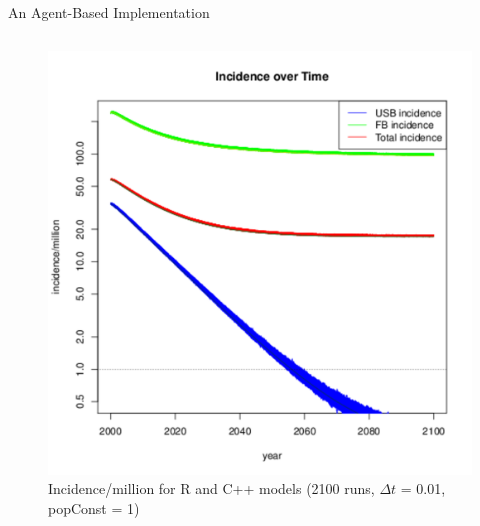 \documentclass[final]{beamer}
\begin{document}
\begin{frame}
\begin{columns}
\begin{column}{.3\textwidth}
\begin{block}{An Agent-Based Implementation}
\begin{block}{}
\begin{column}{.45\textwidth}
\begin{figure}[h]
\begin{center}
                \includegraphics[width=\textwidth]{finalRunSmall}
              \end{center}
              \caption{Incidence/million for R and C++ models (2100 runs, $\Delta t$ = 0.01, popConst = 1)}
              \label{fig:finalRun}
            \end{figure}
          \end{column}
        \end{block}
      \end{block}
      

\end{column}
\end{columns}
\end{frame}
\end{document}
